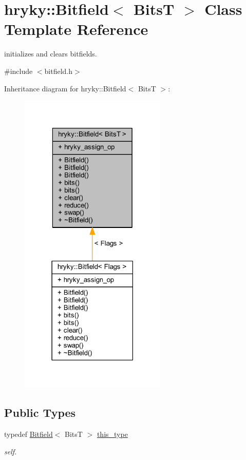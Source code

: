 \hypertarget{classhryky_1_1_bitfield}{\section{hryky\-:\-:Bitfield$<$ Bits\-T $>$ Class Template Reference}
\label{classhryky_1_1_bitfield}
}


initializes and clears bitfields.  




{\ttfamily \#include $<$bitfield.\-h$>$}



Inheritance diagram for hryky\-:\-:Bitfield$<$ Bits\-T $>$\-:
\nopagebreak
\begin{figure}[H]
\begin{center}
\leavevmode
\includegraphics[width=198pt]{classhryky_1_1_bitfield__inherit__graph}
\end{center}
\end{figure}
\subsection*{Public Types}
\begin{DoxyCompactItemize}
\item 
\hypertarget{classhryky_1_1_bitfield_a92159139a91a26878ed5293d99024434}{typedef \hyperlink{classhryky_1_1_bitfield}{Bitfield}$<$ Bits\-T $>$ \hyperlink{classhryky_1_1_bitfield_a92159139a91a26878ed5293d99024434}{this\-\_\-type}}\label{classhryky_1_1_bitfield_a92159139a91a26878ed5293d99024434}

\begin{DoxyCompactList}\small\item\em self. \end{DoxyCompactList}\end{DoxyCompactItemize}
